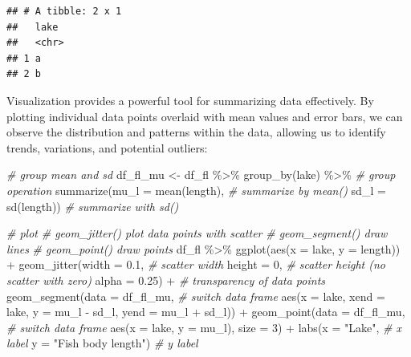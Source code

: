 \documentclass[
]{article}
\newenvironment{Shaded}{\begin{snugshade}}{\end{snugshade}}
\newcommand{\AttributeTok}[1]{\textcolor[rgb]{0.77,0.63,0.00}{#1}}
\newcommand{\CommentTok}[1]{\textcolor[rgb]{0.56,0.35,0.01}{\textit{#1}}}
\newcommand{\DecValTok}[1]{\textcolor[rgb]{0.00,0.00,0.81}{#1}}
\newcommand{\FloatTok}[1]{\textcolor[rgb]{0.00,0.00,0.81}{#1}}
\newcommand{\FunctionTok}[1]{\textcolor[rgb]{0.00,0.00,0.00}{#1}}
\newcommand{\NormalTok}[1]{#1}
\newcommand{\OtherTok}[1]{\textcolor[rgb]{0.56,0.35,0.01}{#1}}
\newcommand{\SpecialCharTok}[1]{\textcolor[rgb]{0.00,0.00,0.00}{#1}}
\newcommand{\StringTok}[1]{\textcolor[rgb]{0.31,0.60,0.02}{#1}}
\begin{document}
\begin{verbatim}
## # A tibble: 2 x 1
##   lake 
##   <chr>
## 1 a    
## 2 b
\end{verbatim}

Visualization provides a powerful tool for summarizing data effectively. By plotting individual data points overlaid with mean values and error bars, we can observe the distribution and patterns within the data, allowing us to identify trends, variations, and potential outliers:

\begin{Shaded}
\begin{Highlighting}[]
\CommentTok{\# group mean and sd}
\NormalTok{df\_fl\_mu }\OtherTok{\textless{}{-}}\NormalTok{ df\_fl }\SpecialCharTok{\%\textgreater{}\%} 
  \FunctionTok{group\_by}\NormalTok{(lake) }\SpecialCharTok{\%\textgreater{}\%} \CommentTok{\# group operation}
  \FunctionTok{summarize}\NormalTok{(}\AttributeTok{mu\_l =} \FunctionTok{mean}\NormalTok{(length), }\CommentTok{\# summarize by mean()}
            \AttributeTok{sd\_l =} \FunctionTok{sd}\NormalTok{(length)) }\CommentTok{\# summarize with sd()}

\CommentTok{\# plot}
\CommentTok{\# geom\_jitter() plot data points with scatter}
\CommentTok{\# geom\_segment() draw lines}
\CommentTok{\# geom\_point() draw points}
\NormalTok{df\_fl }\SpecialCharTok{\%\textgreater{}\%} 
  \FunctionTok{ggplot}\NormalTok{(}\FunctionTok{aes}\NormalTok{(}\AttributeTok{x =}\NormalTok{ lake,}
             \AttributeTok{y =}\NormalTok{ length)) }\SpecialCharTok{+}
  \FunctionTok{geom\_jitter}\NormalTok{(}\AttributeTok{width =} \FloatTok{0.1}\NormalTok{, }\CommentTok{\# scatter width}
              \AttributeTok{height =} \DecValTok{0}\NormalTok{, }\CommentTok{\# scatter height (no scatter with zero)}
              \AttributeTok{alpha =} \FloatTok{0.25}\NormalTok{) }\SpecialCharTok{+} \CommentTok{\# transparency of data points}
  \FunctionTok{geom\_segment}\NormalTok{(}\AttributeTok{data =}\NormalTok{ df\_fl\_mu, }\CommentTok{\# switch data frame}
               \FunctionTok{aes}\NormalTok{(}\AttributeTok{x =}\NormalTok{ lake,}
                   \AttributeTok{xend =}\NormalTok{ lake,}
                   \AttributeTok{y =}\NormalTok{ mu\_l }\SpecialCharTok{{-}}\NormalTok{ sd\_l,}
                   \AttributeTok{yend =}\NormalTok{ mu\_l }\SpecialCharTok{+}\NormalTok{ sd\_l)) }\SpecialCharTok{+}
  \FunctionTok{geom\_point}\NormalTok{(}\AttributeTok{data =}\NormalTok{ df\_fl\_mu, }\CommentTok{\# switch data frame}
             \FunctionTok{aes}\NormalTok{(}\AttributeTok{x =}\NormalTok{ lake,}
                 \AttributeTok{y =}\NormalTok{ mu\_l),}
             \AttributeTok{size =} \DecValTok{3}\NormalTok{) }\SpecialCharTok{+}
  \FunctionTok{labs}\NormalTok{(}\AttributeTok{x =} \StringTok{"Lake"}\NormalTok{, }\CommentTok{\# x label}
       \AttributeTok{y =} \StringTok{"Fish body length"}\NormalTok{) }\CommentTok{\# y label}
\end{Highlighting}
\end{Shaded}
\end{document}
